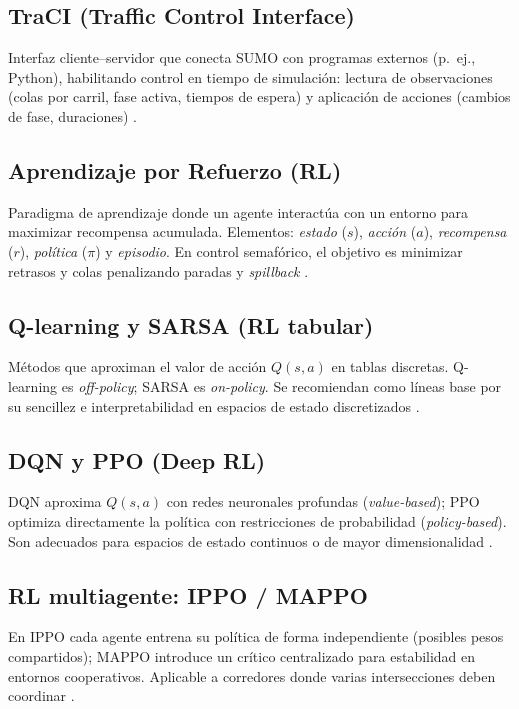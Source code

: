 \subsection*{TraCI (Traffic Control Interface)}
Interfaz cliente–servidor que conecta SUMO con programas externos (p.~ej., Python), habilitando control en tiempo de simulación: lectura de observaciones (colas por carril, fase activa, tiempos de espera) y aplicación de acciones (cambios de fase, duraciones) \citep{TraCI_Docs,TraCI_Whitepaper}.

\subsection*{Aprendizaje por Refuerzo (RL)}
Paradigma de aprendizaje donde un agente interactúa con un entorno para maximizar recompensa acumulada. Elementos: \textit{estado} ($s$), \textit{acción} ($a$), \textit{recompensa} ($r$), \textit{política} ($\pi$) y \textit{episodio}. En control semafórico, el objetivo es minimizar retrasos y colas penalizando paradas y \textit{spillback} \citep{SuttonBarto2018}.

\subsection*{Q-learning y SARSA (RL tabular)}
Métodos que aproximan el valor de acción $Q(s,a)$ en tablas discretas. Q-learning es \textit{off-policy}; SARSA es \textit{on-policy}. Se recomiendan como líneas base por su sencillez e interpretabilidad en espacios de estado discretizados \citep{SuttonBarto2018}.

\subsection*{DQN y PPO (Deep RL)}
DQN aproxima $Q(s,a)$ con redes neuronales profundas (\textit{value-based}); PPO optimiza directamente la política con restricciones de probabilidad (\textit{policy-based}). Son adecuados para espacios de estado continuos o de mayor dimensionalidad \citep{Mnih2015_DQN,Schulman2017_PPO,SB3_Docs}.

\subsection*{RL multiagente: IPPO / MAPPO}
En IPPO cada agente entrena su política de forma independiente (posibles pesos compartidos); MAPPO introduce un crítico centralizado para estabilidad en entornos cooperativos. Aplicable a corredores donde varias intersecciones deben coordinar \citep{Yu2021_MAPPO}.

